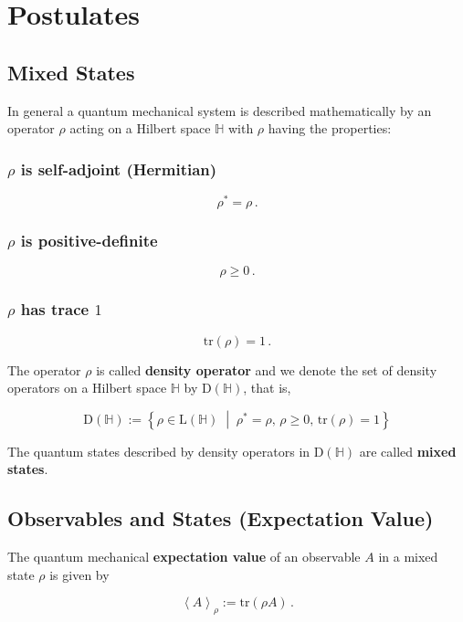 \documentclass[10pt,a4paper]{article}
\newcommand{\<}{\langle}
\renewcommand{\>}{\rangle}
\newcommand{\prths}[1]{\left( #1 \right)}
\newcommand{\chevrons}[1]{\left\< #1 \right\>}
\newcommand{\set}[2]{\left\{ #1 \; \middle\vert \; #2 \right\}}
\newcommand{\tr}[1]{\textrm{tr} \left( #1 \right)}
\begin{document}

\section{Postulates}
\subsection{Mixed States}
In general a quantum mechanical system is described mathematically by an
operator $\rho$ acting on a Hilbert space $\mathbb{H}$ with $\rho$ having the
properties:

\subsubsection{$\rho$ is self-adjoint (Hermitian)}
$$
\rho^* = \rho \, .
$$

\subsubsection{$\rho$ is positive-definite}
$$
\rho \ge 0 \, .
$$

\subsubsection{$\rho$ has trace $1$}
$$
\textrm{tr} \prths{\rho} = 1 \, .
$$

The operator $\rho$ is called \textbf{density operator} and we denote the set
of density operators on a Hilbert space $\mathbb{H}$ by $\textrm{D}
\prths{\mathbb{H}}$, that is,

$$
\mathrm{D} \prths{\mathbb{H}} :=
\set{\rho \in \textrm{L}\prths{\mathbb{H}}}{\rho^* = \rho , \, \rho \ge 0 , \,
\textrm{tr}\prths{\rho} = 1}
$$

The quantum states described by density operators in $\textrm{D}
\prths{\mathbb{H}}$ are called \textbf{mixed states}.

\subsection{Observables and States (Expectation Value)}
The quantum mechanical \textbf{expectation value} of an observable $A$ in a
mixed state $\rho$ is given by

$$
\chevrons{A}_\rho := \tr{\rho A} \, .
$$
\end{document}
